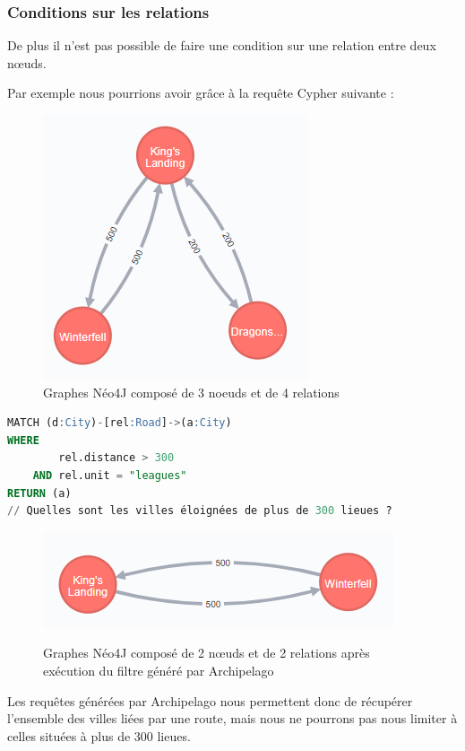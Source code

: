 \documentclass[a4paper,fleqn,12pt,oneside]{report}
\begin{document}
\subsubsection*{\bf Conditions sur les relations}
De plus il n'est  pas possible de faire une condition sur une relation entre deux nœuds. 

Par exemple nous pourrions avoir grâce à la requête Cypher suivante : 

\begin{figure}[!ht]
\centering
\includegraphics[scale=0.8]{figures/citiesRel.png}
\caption{Graphes Néo4J composé de 3 noeuds et de 4 relations}
\label{fig:citiesRel}
\end{figure}
 
\begin{lstlisting}[language=SQL]
MATCH (d:City)-[rel:Road]->(a:City)
WHERE
	    rel.distance > 300
	AND rel.unit = "leagues"
RETURN (a)
// Quelles sont les villes éloignées de plus de 300 lieues ?
\end{lstlisting} 


\begin{figure}[!ht]
\centering
\includegraphics[scale=0.8]{figures/citiesRelFilt.png}
\label{fig:citiesRelFilt}
\caption{Graphes Néo4J composé de 2 nœuds et de 2 relations après exécution du filtre généré par Archipelago}
\end{figure}

Les requêtes générées par Archipelago nous permettent donc de récupérer l'ensemble des villes liées par une route, mais nous ne pourrons pas nous limiter à celles situées à plus de 300 lieues.
\end{document}
